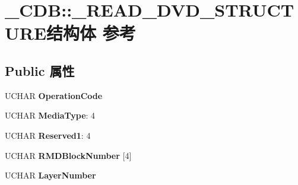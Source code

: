 \hypertarget{struct___c_d_b_1_1___r_e_a_d___d_v_d___s_t_r_u_c_t_u_r_e}{}\section{\+\_\+\+C\+DB\+:\+:\+\_\+\+R\+E\+A\+D\+\_\+\+D\+V\+D\+\_\+\+S\+T\+R\+U\+C\+T\+U\+R\+E结构体 参考}
\label{struct___c_d_b_1_1___r_e_a_d___d_v_d___s_t_r_u_c_t_u_r_e}
\subsection*{Public 属性}
\begin{DoxyCompactItemize}
\item 
\mbox{\label{struct___c_d_b_1_1___r_e_a_d___d_v_d___s_t_r_u_c_t_u_r_e_a28413d8a2b4555b11ac6c4ad883436fb}} 
U\+C\+H\+AR {\bfseries Operation\+Code}
\item 
\mbox{\label{struct___c_d_b_1_1___r_e_a_d___d_v_d___s_t_r_u_c_t_u_r_e_af26a32a24513266f1bee4d42fe593c42}} 
U\+C\+H\+AR {\bfseries Media\+Type}\+: 4
\item 
\mbox{\label{struct___c_d_b_1_1___r_e_a_d___d_v_d___s_t_r_u_c_t_u_r_e_a742c4211b4f1a01e93cad869232a26cd}} 
U\+C\+H\+AR {\bfseries Reserved1}\+: 4
\item 
\mbox{\label{struct___c_d_b_1_1___r_e_a_d___d_v_d___s_t_r_u_c_t_u_r_e_a7add80a5c3aa8245a93a93abce54af2b}} 
U\+C\+H\+AR {\bfseries R\+M\+D\+Block\+Number} \mbox{[}4\mbox{]}
\item 
\mbox{\label{struct___c_d_b_1_1___r_e_a_d___d_v_d___s_t_r_u_c_t_u_r_e_a9408dc1ad9bbc15d6bd9dc74490ec120}} 
U\+C\+H\+AR {\bfseries Layer\+Number}
\item 
\mbox{\label{struct___c_d_b_1_1___r_e_a_d___d_v_d___s_t_r_u_c_t_u_r_e_a3b48fba34d08db6c8d8c48a380dc4f58}} 

\end{DoxyCompactItemize}
